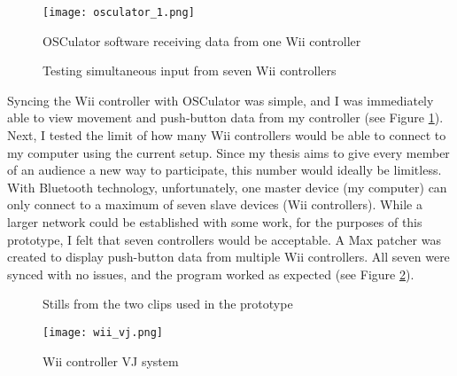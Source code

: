 \begin{figure}
	\centering

	\texttt{[image: osculator\_1.png]}
	\caption{OSCulator software receiving data from one Wii controller}

	\label{prototyping1.1}
\end{figure}

\begin{figure}
	\centering

	\hspace{0.1cm}
	\caption{Testing simultaneous input from seven Wii controllers}

	\label{prototyping1.2}
\end{figure}

Syncing the Wii controller with OSCulator was simple, and I was immediately able to view movement and push-button data from my controller (see Figure \ref{prototyping1.1}). Next, I tested the limit of how many Wii controllers would be able to connect to my computer using the current setup. Since my thesis aims to give every member of an audience a new way to participate, this number would ideally be limitless. With Bluetooth technology, unfortunately, one master device (my computer) can only connect to a maximum of seven slave devices (Wii controllers). While a larger network could be established with some work, for the purposes of this prototype, I felt that seven controllers would be acceptable. A Max patcher was created to display push-button data from multiple Wii controllers. All seven were synced with no issues, and the program worked as expected (see Figure \ref{prototyping1.2}).

\begin{figure}
	\centering

	\hspace{0.1cm}
	\caption{Stills from the two clips used in the prototype}

	\label{prototyping1.3}
\end{figure}

\begin{figure}
	\centering

	\texttt{[image: wii\_vj.png]}
	\caption{Wii controller VJ system}

	\label{prototyping1.4}
\end{figure}

